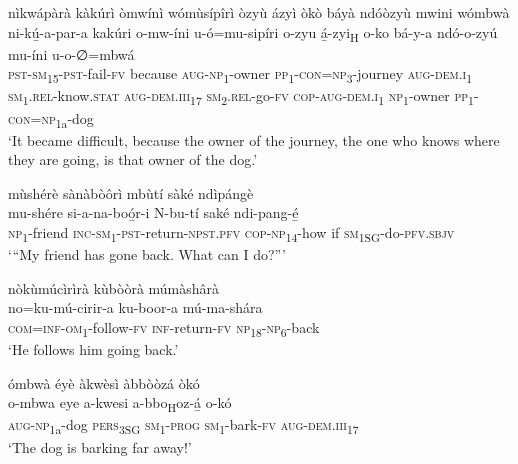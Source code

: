 nìkwápàrà kàkúrì òmwínì wómùsípîrì òzyù ázyì òkò báyà ndóòzyù mwini wómbwà\\
\gll ni-kú̲-a-par-a    kakúri    o-mw-íni    u-ó=mu-sipíri o-zyu    á̲-zyi\textsubscript{H}      o-ko      bá-y-a ndó-o-zyú    mu-íni  u-o-∅=mbwá \\ 
\textsc{pst}{}-\textsc{sm}\textsubscript{15}{}-\textsc{pst}{}-fail-\textsc{fv}  because  \textsc{aug}{}-\textsc{np}\textsubscript{1}{}-owner  \textsc{pp}\textsubscript{1}{}-\textsc{con}=\textsc{np}\textsubscript{3}{}-journey
\textsc{aug}{}-\textsc{dem}.\textsc{i}\textsubscript{1}  \textsc{sm}\textsubscript{1}.\textsc{rel}{}-know.\textsc{stat}  \textsc{aug}{}-\textsc{dem}.\textsc{iii}\textsubscript{17}  \textsc{sm}\textsubscript{2}.\textsc{rel}{}-go-\textsc{fv}
\textsc{cop}{}-\textsc{aug}{}-\textsc{dem}.\textsc{i}\textsubscript{1}  \textsc{np}\textsubscript{1}{}-owner  \textsc{pp}\textsubscript{1}{}-\textsc{con}=\textsc{np}\textsubscript{1a}{}-dog \\
\glt ‘It became difficult, because the owner of the journey, the one who knows where they are going, is that owner of the dog.’\bigskip

mùshérè sànàbòôrì mbùtí sàké ndìpángè\\
\gll mu-shére  si-a-na-boó̲r-i N-bu-tí    saké  ndi-pang-é̲ \\
\textsc{np}\textsubscript{1}{}-friend  \textsc{inc}{}-\textsc{sm}\textsubscript{1}{}-\textsc{pst}{}-return-\textsc{npst}.\textsc{pfv}
\textsc{cop}{}-\textsc{np}\textsubscript{14}{}-how  if  \textsc{sm}\textsubscript{1SG}{}-do-\textsc{pfv}.\textsc{sbjv}\\
\glt ‘“My friend has gone back. What can I do?”’\bigskip

nòkùmúcìrìrà kùbòòrà múmàshârà\\
\gll no=ku-mú-cirir-a    ku-boor-a    mú-ma-shára\\
\textsc{com}=\textsc{inf}{}-\textsc{om}\textsubscript{1}{}-follow-\textsc{fv}  \textsc{inf}{}-return-\textsc{fv}  \textsc{np}\textsubscript{18}{}-\textsc{np}\textsubscript{6}{}-back\\
\glt ‘He follows him going back.’\bigskip

\newpage
ómbwà éyè àkwèsì àbbòòzá òkó\\
\gll o-mbwa    eye    a-kwesi  a-bbo\textsubscript{H}oz-á̲  o-kó\\
\textsc{aug}{}-\textsc{np}\textsubscript{1a}{}-dog  \textsc{pers}\textsubscript{3SG}  \textsc{sm}\textsubscript{1}{}-\textsc{prog}  \textsc{sm}\textsubscript{1}{}-bark-\textsc{fv}  \textsc{aug}{}-\textsc{dem}.\textsc{iii}\textsubscript{17}\\
\glt ‘The dog is barking far away!’\bigskip

